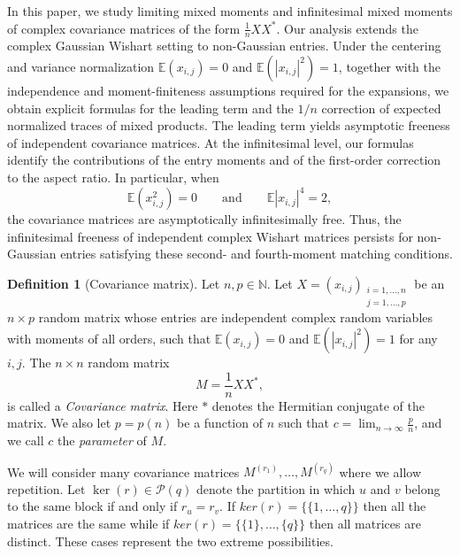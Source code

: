 \documentclass{article}
\theoremstyle{definition}
\newtheorem{definition} [theorem]{Definition}
\newcommand{\E}{\mathbb{E}}
\newcommand{\cP}{\mathcal{P}}
\begin{document}
In this paper, we study limiting mixed moments and
infinitesimal mixed moments of complex covariance matrices
of the form $\frac{1}{n}XX^*$.
Our analysis extends the complex Gaussian Wishart setting
to non-Gaussian entries.
Under the centering and variance normalization
$\mathbb{E}(x_{i,j})=0$ and
$\mathbb{E}(|x_{i,j}|^2)=1$, together with the independence
and moment-finiteness assumptions required for the
expansions, we obtain explicit formulas for the leading
term and the $1/n$ correction of expected normalized
traces of mixed products.
The leading term yields asymptotic freeness of independent
covariance matrices.
At the infinitesimal level, our formulas identify the
contributions of the entry moments and of the first-order
correction to the aspect ratio.
In particular, when
\[
\mathbb{E}(x_{i,j}^2)=0
\qquad\text{and}\qquad
\mathbb{E}|x_{i,j}|^4=2,
\]
the covariance matrices are asymptotically infinitesimally
free.
Thus, the infinitesimal freeness of independent complex
Wishart matrices persists for non-Gaussian entries satisfying
these second- and fourth-moment matching conditions.


\begin{definition}[Covariance matrix]
Let $n,p\in\mathbb{N}$. Let $X=(x_{i,j})_{\substack{i=1,\dots,n \\ j=1,\dots,p}}$ be an $n\times p$ random matrix whose entries are independent complex random variables with moments of all orders, such that $\E(x_{i,j})=0$ and $\E(|x_{i,j}|^2)=1$ for any $i,j$. The $n\times n$ random matrix
$$M=\frac{1}{n}XX^{*},$$
is called a \textit{Covariance matrix}. Here $*$ denotes the Hermitian conjugate of the matrix. We also let $p=p(n)$ be a function of $n$ such that $c=\lim_{n\to\infty}\frac{p}{n}$, and we call $c$ the \textit{parameter} of $M$.
\end{definition}

We will consider many covariance matrices $M^{(r_1)},\dots,M^{(r_q)}$ where we allow repetition. Let $\ker(r)\in\cP(q)$ denote the partition in which $u$ and $v$
belong to the same block if and only if $r_u=r_v$. If $ker(r)=\{\{1,\dots,q\}\}$ then all the matrices are the same while if $ker(r)=\{\{1\},\dots,\{q\}\}$ then all matrices are distinct. These cases represent the two extreme possibilities. 
\end{document}
